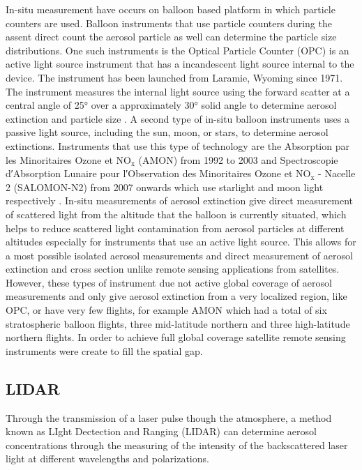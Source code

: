 In-situ measurement have occurs on balloon based platform in which particle counters are used. Balloon instruments that use particle counters during the assent direct count the aerosol particle as well can determine the particle size distributions. One such instruments is the Optical Particle Counter (OPC) is an active light source instrument that has a incandescent light source internal to the device. The instrument has been launched from Laramie, Wyoming since 1971. The instrument measures the internal light source using the forward scatter at a central angle of 25\si{\degree} over a approximately 30\si{\degree} solid angle to determine aerosol extinction and particle size \citep{Rosen1964, Deshler2003}. A second type of in-situ balloon instruments uses a passive light source, including the sun, moon, or stars, to determine aerosol extinctions. Instruments that use this type of technology are the Absorption par les Minoritaires Ozone et $\text{NO}_{\text{x}}$ (AMON) from 1992 to 2003 and Spectroscopie d\si{\arcminute}Absorption Lunaire pour l\si{\arcminute}Observation des Minoritaires Ozone et $\text{NO}_{\text{x}}$ - Nacelle 2 (SALOMON-N2) from 2007 onwards which use starlight and moon light respectively \citep{Berthet2002}. In-situ measurements of aerosol extinction give direct measurement of scattered light from the altitude that the balloon is currently situated, which helps to reduce scattered light contamination from aerosol particles at different altitudes especially for instruments that use an active light source. This allows for a most possible isolated aerosol measurements  and direct measurement of aerosol extinction and cross section unlike remote sensing applications from satellites. However, these types of instrument due not active global coverage of aerosol measurements and only give aerosol extinction from a very localized region, like OPC, or have very few flights, for example AMON which had a total of six stratospheric balloon flights, three mid-latitude northern and three high-latitude northern flights. In order to achieve full global coverage satellite remote sensing instruments were create to fill the spatial gap.

\subsection{LIDAR}

Through the transmission of a laser pulse though the atmosphere, a method known as LIght Dectection and Ranging (LIDAR) can determine aerosol concentrations through the measuring of the intensity of the backscattered laser light at different wavelengths and polarizations.

